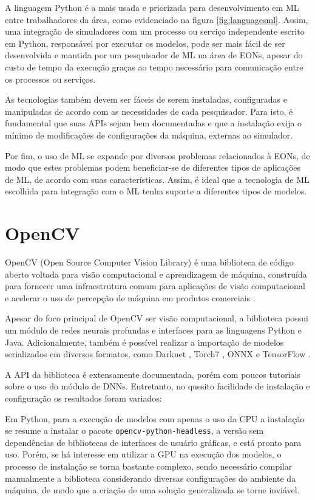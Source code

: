 A linguagem Python é a mais usada e priorizada para desenvolvimento em ML entre trabalhadores da área, como evidenciado na figura \ref{fig:languagesml}. Assim, uma integração de simuladores com um processo ou serviço independente escrito em Python, responsável por executar os modelos, pode ser mais fácil de ser desenvolvida e mantida por um pesquisador de ML na área de EONs, apesar do custo de tempo da execução graças ao tempo necessário para comunicação entre os processos ou serviços.

As tecnologias também devem ser fáceis de serem instaladas, configuradas e manipuladas de acordo com as necessidades de cada pesquisador. Para isto, é fundamental que suas APIs sejam bem documentadas e que a instalação exija o mínimo de modificações de configurações da máquina, externas ao simulador.

Por fim, o uso de ML se expande por diversos problemas relacionados à EONs, de modo que estes problemas podem beneficiar-se de diferentes tipos de aplicações de ML, de acordo com suas características. Assim, é ideal que a tecnologia de ML escolhida para integração com o ML tenha suporte a diferentes tipos de modelos.

\section{OpenCV}

OpenCV (Open Source Computer Vision Library) é uma biblioteca de código aberto voltada para visão computacional e aprendizagem de máquina, construída para fornecer uma infraestrutura comum para aplicações de visão computacional e acelerar o uso de percepção de máquina em produtos comerciais \cite{ml_site_opencv}.

Apesar do foco principal de OpenCV ser visão computacional, a biblioteca possui um módulo de redes neurais profundas e interfaces para as linguagens Python e Java. Adicionalmente, também é possível realizar a importação de modelos serializados em diversos formatos, como Darknet \cite{ml_site_darknet}, Torch7 \cite{ml_site_torch}, ONNX \cite{ml_site_onnx} e TensorFlow \cite{ml_site_tensorflow}.

A API da biblioteca é extensamente documentada, porém com poucos tutoriais sobre o uso do módulo de DNNs. Entretanto, no quesito facilidade de instalação e configuração os resultados foram variados:

Em Python, para a execução de modelos com apenas o uso da CPU a instalação se resume a instalar o pacote \texttt{opencv-python-headless}, a versão sem dependências de bibliotecas de interfaces de usuário gráficas, e está pronto para uso. Porém, se há interesse em utilizar a GPU na execução dos modelos, o processo de instalação se torna bastante complexo, sendo necessário compilar manualmente a biblioteca considerando diversas configurações do ambiente da máquina, de modo que a criação de uma solução generalizada se torne inviável.

